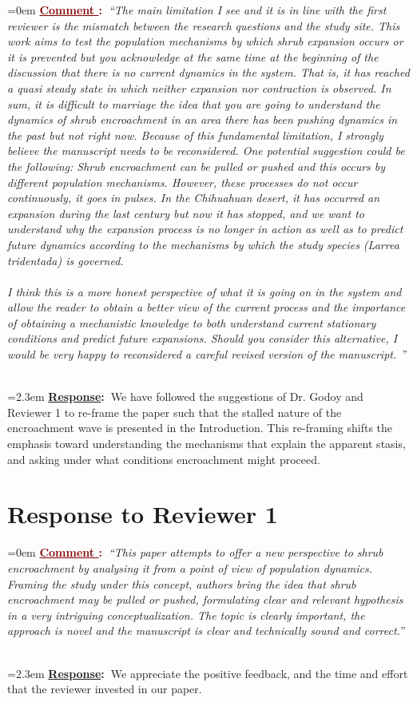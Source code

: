 \documentclass[12pt]{article}
\newcounter{cN}
\newcommand{\comment}[1]{
	\vspace{2em}
	\refstepcounter{cN} %
	\noindent \hangindent=0em \textbf{\textcolor{Maroon}{\uline{Comment \thecN}:~}}\emph{``#1''}
	}
\newcommand{\response}[1]{
	\\[0.25em]
	\hangindent=2.3em \textbf{\textcolor{NavyBlue}{\uline{Response}:~}}#1
	}
\begin{document}
\comment{The main limitation I see and it is in line with the first reviewer is the mismatch between the research questions and the study site. This work aims to test the population mechanisms by which shrub expansion occurs or it is prevented but you acknowledge at the same time at the beginning of the discussion that there is no current dynamics in the system. That is, it has reached a quasi steady state in which neither expansion nor contraction is observed. In sum, it is difficult to marriage the idea that you are going to understand the dynamics of shrub encroachment in an area there has been pushing dynamics in the past but not right now. Because of this fundamental limitation, I strongly believe the manuscript needs to be reconsidered. One potential suggestion could be the following: Shrub encroachment can be pulled or pushed and this occurs by different population mechanisms. However, these processes do not occur continuously, it goes in pulses. In the Chihuahuan desert, it has occurred an expansion during the last century but now it has stopped, and we want to understand why the expansion process is no longer in action as well as to predict future dynamics according to the mechanisms by which the study species (Larrea tridentada) is governed. 
\\
\\
I think this is a more honest perspective of what it is going on in the system and allow the reader to obtain a better view of the current process and the importance of obtaining a mechanistic knowledge to both understand current stationary conditions and predict future expansions. Should you consider this alternative, I would be very happy to reconsidered a careful revised version of the manuscript.  
}
\response{We have followed the suggestions of Dr. Godoy and Reviewer 1 to re-frame the paper such that the stalled nature of the encroachment wave is presented in the Introduction. This re-framing shifts the emphasis toward understanding the mechanisms that explain the apparent stasis, and asking under what conditions encroachment might proceed.}

\section{Response to Reviewer 1}
\vspace{-2em}

\comment{This paper attempts to offer a new perspective to shrub encroachment by analysing it from a point of view of population dynamics. Framing the study under this concept, authors bring the  idea that shrub encroachment may be pulled or pushed, formulating clear and relevant hypothesis in a very intriguing conceptualization. The topic is clearly important, the approach is novel and the manuscript is clear and technically sound and correct.}
\response{We appreciate the positive feedback, and the time and effort that the reviewer invested in our paper.}
\end{document}
